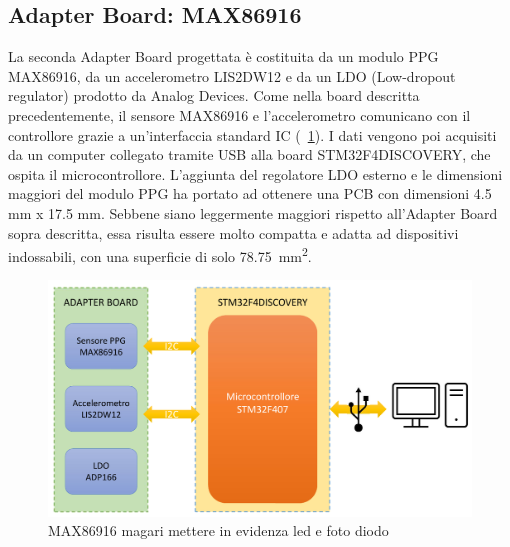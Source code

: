 \pagebreak
\subsection{Adapter Board: MAX86916}
La seconda Adapter Board progettata è costituita da un modulo PPG MAX86916, da un accelerometro LIS2DW12 e da un LDO (Low-dropout regulator) prodotto da Analog Devices. Come nella board descritta precedentemente, il sensore MAX86916 e l'accelerometro comunicano con il controllore grazie a un'interfaccia standard IC (\Fig~\ref{fig:DiagrammaBlocchiMAX86916}). I dati vengono poi acquisiti da un computer collegato tramite USB alla board STM32F4DISCOVERY, che ospita il microcontrollore. L'aggiunta del regolatore LDO esterno e le dimensioni maggiori del modulo PPG ha portato ad ottenere una PCB con dimensioni 4.5 mm x 17.5 mm. Sebbene siano leggermente maggiori rispetto all'Adapter Board sopra descritta, essa risulta essere molto compatta e adatta ad dispositivi indossabili, con una superficie di solo \SI{78.75}{\square\milli\meter}.
\begin{figure}[t]
	\centering
	\includegraphics[width=0.6\linewidth]{ImageFiles/Hardware/DiagrammaBlocchiMAX86916}
	\caption{MAX86916 magari mettere in evidenza led e foto diodo}
	\label{fig:DiagrammaBlocchiMAX86916}
\end{figure}

